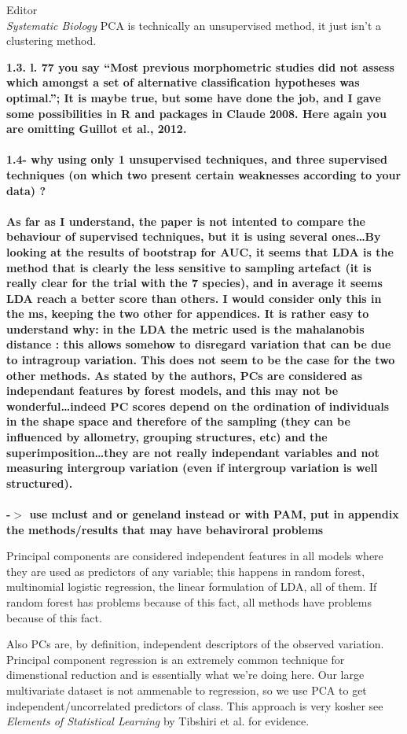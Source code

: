 \documentclass{letter}
\begin{document}
\begin{letter}{Editor \\ \textit{Systematic Biology}}
  PCA is technically an unsupervised method, it just isn't a clustering method.


  \textbf{1.3. l. 77 you say ``Most previous morphometric studies did not assess which amongst a set of alternative classification hypotheses was optimal.''; It is maybe true, but some have done the job, and I gave some possibilities in R and packages in Claude 2008. Here again you are omitting Guillot et al., 2012. \\\\
    1.4- why using only 1 unsupervised techniques, and three supervised techniques (on which two present certain weaknesses according to your data) ?\\\\
    As far as I understand, the paper is not intented to compare the behaviour of supervised techniques, but it is using several ones\ldots By looking at the results of bootstrap for AUC, it seems that LDA is the method that is clearly the less sensitive to sampling artefact (it is really clear for the trial with the 7 species), and in average it seems LDA reach a better score than others. I would consider only this in the ms, keeping the two other for appendices. It is rather easy to understand why: in the LDA the metric used is the mahalanobis distance : this allows somehow to disregard variation that can be due to intragroup variation. This does not seem to be the case for the two other methods. As stated by the authors, PCs are considered as independant features by forest models, and this may not be wonderful\ldots indeed PC scores depend on the ordination of individuals in the shape space and therefore of the sampling (they can be influenced by allometry, grouping structures, etc) and the superimposition\ldots they are not really independant variables and not measuring intergroup variation (even if intergroup variation is well structured). \\\\
  -\(>\) use mclust and or geneland instead or with PAM, put in appendix the methods/results that may have behaviroral problems}

  Principal components are considered independent features in all models where they are used as predictors of any variable; this happens in random forest, multinomial logistic regression, the linear formulation of LDA, all of them. If random forest has problems because of this fact, all methods have problems because of this fact. 

  Also PCs are, by definition, independent descriptors of the observed variation. Principal component regression is an extremely common technique for dimenstional reduction and is essentially what we're doing here. Our large multivariate dataset is not ammenable to regression, so we use PCA to get independent/uncorrelated predictors of class. This approach is very kosher see \textit{Elements of Statistical Learning} by Tibshiri et al. for evidence. 


\end{letter}
\end{document}
